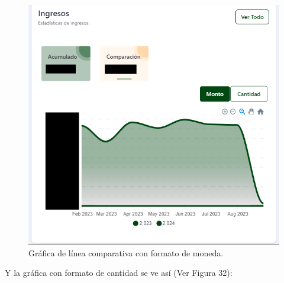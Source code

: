     \begin{figure}[H]
        \begin{center}
            \includegraphics[scale=0.40]{img/actividades/dahsboard-admin/ingreso-comp-monto.png}
            \caption{Gráfica de línea comparativa con formato de moneda.}
            \label{fig:ingreso-comp-monto}
        \end{center}
    \end{figure}

Y la gráfica con formato de cantidad se ve así (Ver Figura 32): 

